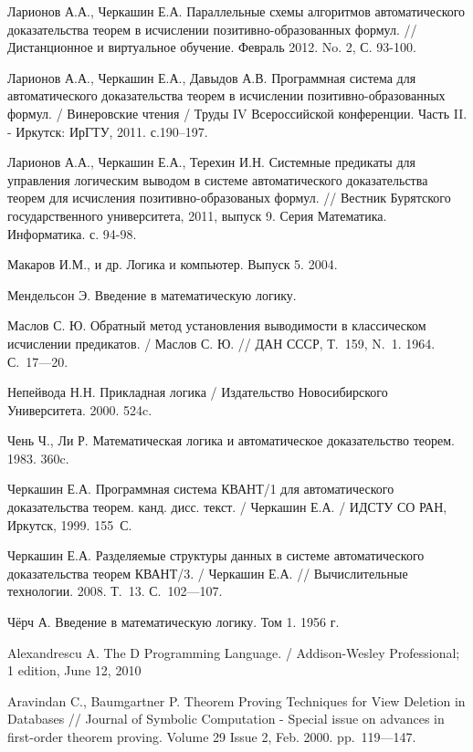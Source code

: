 \begin{thebibliography}{99}
 Ларионов А.А., Черкашин Е.А. Параллельные схемы алгоритмов автоматического доказательства теорем в исчислении позитивно-образованных формул. // Дистанционное и виртуальное обучение. Февраль 2012. No. 2, С. 93-100.

 Ларионов А.А., Черкашин Е.А., Давыдов А.В. Программная система для автоматического доказательства теорем в исчислении позитивно-образованных формул. / Винеровские чтения / Труды IV Всероссийской конференции. Часть II. - Иркутск: ИрГТУ, 2011. с.190--197.

 Ларионов А.А., Черкашин Е.А., Терехин И.Н. Системные предикаты для управления логическим выводом в системе автоматического доказательства теорем для исчисления позитивно-образованых формул. // Вестник Бурятского государственного университета, 2011, выпуск 9. Серия Математика. Информатика. с. 94-98.

 Макаров И.М., и др. Логика и компьютер. Выпуск 5. 2004.

 Мендельсон Э. Введение в математическую логику.

 Маслов С. Ю. Обратный метод установления выводимости в классическом исчислении предикатов. / Маслов С. Ю. // ДАН СССР, Т.~159, N.~1. 1964. С.~17---20.

 Непейвода Н.Н. Прикладная логика / Издательство Новосибирского Университета. 2000. 524c.

 Чень Ч., Ли Р. Математическая логика и автоматическое доказательство теорем. 1983. 360c.

 Черкашин Е.А. Программная система КВАНТ/1 для автоматического доказательства теорем. канд. дисс. текст. / Черкашин Е.А. / ИДСТУ СО РАН, Иркутск, 1999. 155~С.

 Черкашин Е.А. Разделяемые структуры данных в системе автоматического доказательства теорем КВАНТ/3. / Черкашин Е.А. // Вычислительные технологии. 2008. Т.~13. С.~102---107.

 Чёрч А. Введение в математическую логику. Том 1. 1956 г.




 Alexandrescu A. The D Programming Language. / Addison-Wesley Professional; 1 edition, June 12, 2010

 Aravindan C., Baumgartner P. Theorem Proving Techniques for View Deletion in Databases // Journal of Symbolic Computation - Special issue on advances in first-order theorem proving. Volume 29 Issue 2, Feb. 2000. pp.~119---147.


\end{thebibliography}
